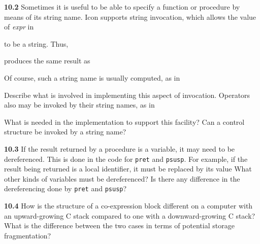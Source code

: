 \textbf{10.2} Sometimes it is useful to be able to specify a function
or procedure by means of its string name. Icon supports
{\textquotedbl}string invocation,{\textquotedbl} which allows the
value of \textit{expr} in

\goodbreak
{}

\noindent to be a string. Thus,


\noindent produces the same result as


Of course, such a string name is usually computed, as in


Describe what is involved in implementing this aspect of
invocation. Operators also may be invoked by their string names, as in


What is needed in the implementation to support this facility? Can a
control structure be invoked by a string name?

\textbf{10.3} If the result returned by a procedure is a variable, it
may need to be dereferenced. This is done in the code for
\texttt{pret} and \texttt{psusp}. For example, if the result being
returned is a local identifier, it must be replaced by its value What
other kinds of variables must be dereferenced? Is there any difference
in the dereferencing done by \texttt{pret} and \texttt{psusp}?

\textbf{10.4} How is the structure of a co-expression block different
on a computer with an upward-growing C stack compared to one with a
downward-growing C stack? What is the difference between the two cases
in terms of potential storage fragmentation?
